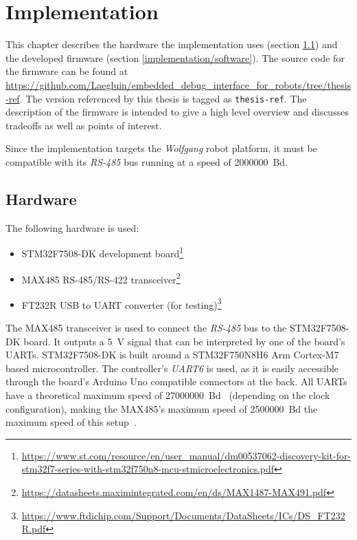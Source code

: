 \chapter{Implementation}
\label{implementation}

This chapter describes the hardware the implementation uses (section \ref{implementation/hardware})
and the developed firmware (section \ref{implementation/software}). The source code for the firmware
can be found at \url{https://github.com/Laegluin/embedded_debug_interface_for_robots/tree/thesis-ref}.
The version referenced by this thesis is tagged as \lstinline{thesis-ref}. The description of the
firmware is intended to give a high level overview and discusses tradeoffs as well as points of
interest.

Since the implementation targets the \textit{Wolfgang} robot platform, it must be compatible with
its \textit{RS-485} bus running at a speed of \SI{2000000}{Bd}.

\section{Hardware}
\label{implementation/hardware}

The following hardware is used:

\begin{itemize}
    \item STM32F7508-DK development board\footnote{\url{https://www.st.com/resource/en/user_manual/dm00537062-discovery-kit-for-stm32f7-series-with-stm32f750n8-mcu-stmicroelectronics.pdf}}
    \item MAX485 RS-485/RS-422 transceiver\footnote{\url{https://datasheets.maximintegrated.com/en/ds/MAX1487-MAX491.pdf}}
    \item FT232R USB to UART converter (for testing)\footnote{\url{https://www.ftdichip.com/Support/Documents/DataSheets/ICs/DS_FT232R.pdf}}
\end{itemize}

The MAX485 transceiver is used to connect the \textit{RS-485} bus to the STM32F7508-DK board. It
outputs a \SI{5}{\volt} signal that can be interpreted by one of the board's UARTs. STM32F7508-DK
is built around a STM32F750N8H6 Arm Cortex-M7 based microcontroller. The controller's \textit{UART6}
is used, as it is easily accessible through the board's Arduino Uno compatible connectors at the
back. All UARTs have a theoretical maximum speed of \SI{27000000}{Bd}~\cite{mcu-ref-manual} (depending
on the clock configuration), making the MAX485's maximum speed of \SI{2500000}{Bd} the maximum speed
of this setup~\cite{max-485-manual}\cite{board-user-manual}.

